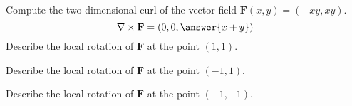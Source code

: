 \begin{problem}
Compute the two-dimensional curl of the vector field $\mathbf{F}(x,y) = (-xy, xy)$.
\[
\nabla\times \mathbf{F} = \left(0,0,\answer{x+y}\right)
\]
Describe the local rotation of $\mathbf{F}$ at the point $(1,1)$.
\begin{multipleChoice}
\end{multipleChoice}
Describe the local rotation of $\mathbf{F}$ at the point $(-1,1)$.
\begin{multipleChoice}
\end{multipleChoice}
Describe the local rotation of $\mathbf{F}$ at the point $(-1,-1)$.
\begin{multipleChoice}
\end{multipleChoice}
\end{problem}